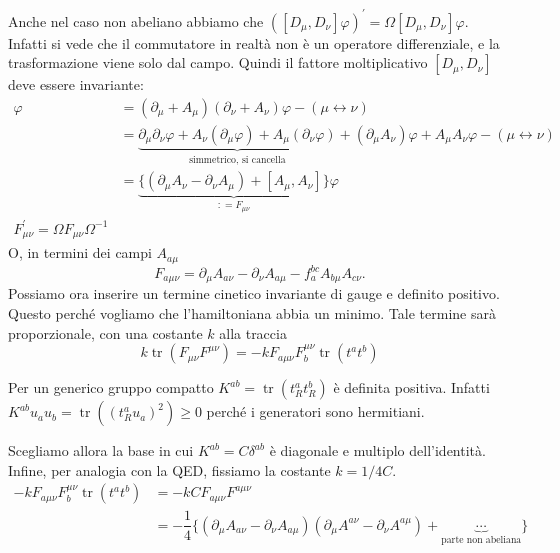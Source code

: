 \documentclass[italian,a4paper]{article}
\theoremstyle{definition}
\DeclareMathOperator{\tr}{tr}
\newcommand{\dimu}{\ensuremath{\partial_{\mu}}}
\newcommand{\Dimu}{\ensuremath{D_{\mu}}}
\newcommand{\dinu}{\ensuremath{\partial_{\nu}}}
\newcommand{\Dinu}{\ensuremath{D_{\nu}}}
\begin{document}
\begin{enumerate}
        Anche nel caso non abeliano abbiamo che $([\Dimu,
        \Dinu]\varphi)^\prime = \Omega [\Dimu, \Dinu]\varphi$. Infatti si
        vede che il commutatore in realt\`a non \`e un operatore
        differenziale, e la trasformazione viene solo dal campo. Quindi il
        fattore moltiplicativo $[\Dimu, \Dinu]$ deve essere invariante:
        \begin{align*}
            [\Dimu, \Dinu]\varphi &= (\dimu + A_\mu)(\dinu + A_\nu) \varphi -
            (\mu \leftrightarrow \nu)\\
            &= \underbrace{\dimu \dinu \varphi + A_\nu(\dimu \varphi) + A_\mu(\dinu
            \varphi)}_{\text{simmetrico, si cancella}} + (\dimu A_\nu)\varphi + A_\mu
            A_\nu \varphi - (\mu \leftrightarrow \nu)\\
            &= \underbrace{\{ (\dimu A_\nu - \dinu A_\mu) + [A_\mu, A_\nu]
            \}}_{\mathop{:}= F_{\mu\nu}} \varphi\\
            F_{\mu\nu}^\prime = \Omega F_{\mu\nu} \Omega^{-1}
        \end{align*}
        O, in termini dei campi $A_{a\mu}$
        \begin{equation}
            F_{a\mu\nu} = \dimu A_{a\nu} - \dinu A_{a\mu} - f^{bc}_a
            A_{b\mu}A_{c\nu}.
            \label{eq:fmunu}
        \end{equation}
        Possiamo ora inserire un termine cinetico invariante di gauge e
        definito positivo. Questo perch\'e vogliamo che l'hamiltoniana abbia
        un minimo. Tale termine sar\`a proporzionale, con una costante
        $k$ alla traccia
        \begin{equation*}
            k \tr(F_{\mu\nu}F^{\mu\nu}) = -k F_{a\mu\nu}F^{\mu\nu}_b \tr(t^a
            t^b)
        \end{equation*}
        
        Per un generico gruppo compatto $K^{ab} = \tr(t^a_R t^b_R)$
        \`e definita positiva. Infatti $K^{ab}u_a u_b = \tr( (t^a_R u_a)^2)
        \geq 0$ perch\'e i generatori sono hermitiani.

        Scegliamo allora la base in cui $K^{ab} = C\delta^{ab}$ \`e diagonale e multiplo
        dell'identit\`a. Infine, per analogia con la QED, fissiamo la
        costante $k = 1/4C$.
        \begin{align*}
            -k F_{a\mu\nu}F^{\mu\nu}_b \tr(t^a t^b) &= -kC
            F_{a\mu\nu}F^{a\mu\nu}\\
            &= -\dfrac{1}{4}\{ (\dimu A_{a\nu} - \dinu A_{a\mu})
            (\dimu A^{a\nu} - \dinu A^{a\mu}) + \underbrace{\cdots}_{\text{parte non
            abeliana}}\}
        \end{align*}
\end{enumerate}
\end{document}
